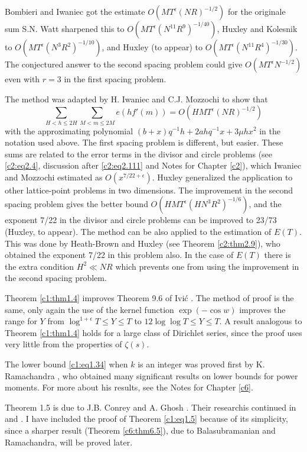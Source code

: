 Bombieri and Iwaniec got the estimate $O(MT^\epsilon (NR)^{-1/2})$ for
the originale sum S.N. Watt \cite{Watt1} sharpened this to $O (MT^\epsilon
(N^{11}R^9)^{-1/40})$,  Huxley and Kolesnik \cite{Huxley and Kolesnik1}\pageoriginale to
$O(MT^\epsilon (N^3 R^2)^{-1/10})$, and Huxley (to appear) to
$O(MT^\epsilon (N^{11} R^4)^{-1/30})$. The conjectured answer to the
second spacing problem could give $O(MT^\epsilon N^{- 1/2})$ even with
$r=3$ in the first spacing problem.

The method was adapted by H. Iwaniec and C.J. Mozzochi \cite{Iwaniec1} to
show that
$$
\sum_{H < h \leq 2H} \sum_{M< m \leq 2M} e(hf' (m))= O(HMT^\epsilon
(NR)^{-1/2}) 
$$ 
with the approximating polynomial $(b + x)q^{-1}h + 2 ah q^{-1} x+ 3
\mu h x^2$ in the notation used above. The first spacing problem is
different, but easier. These sums are related to the error terms in
the divisor and circle problems (see \eqref{c2:eq2.4}, discussion
after \eqref{c2:eq2.111} and Notes for Chapter \ref{c2}), which Iwaniec and
Mozzochi estimated as $O(x^{7/22+ \epsilon})$. Huxley \cite{Huxley2}
generalized the application to other lattice-point problems in two
dimensions. The improvement in the second spacing problem gives the
better bound $O(HMT^\epsilon (HN^3 R^2)^{-1/6})$, and the exponent 7/22
  in the divisor and circle problems can be improved to 23/73 (Huxley,
  to appear). The method can be also applied to the estimation of
  $E(T)$. This was done by Heath-Brown and Huxley \cite{Heath-Brown and Huxley1} (see
  Theorem \ref{c2:thm2.9}), who obtained the exponent 7/22 in this
  problem also.  In the case of $E(T)$ there is the extra condition
  $H^2 \ll NR$ which prevents one from using the improvement in the
  second spacing problem.

Theorem \ref{c1:thm1.4} improves Theorem 9.6 of Ivi\'c
\cite{Ivic1}. The method of proof is the same, only again the use of the
kernel function $\exp(- \cos w)$ improves the range for $Y$ from
$\log^{1+ \epsilon} T \leq Y \leq T$ to $12 \log \log T \leq Y \leq
T$. A result analogous to Theorem \ref{c1:thm1.4} holds for a large
class of Dirichlet series, since the proof uses very little from the
properties of $\zeta(s)$.

The lower bound \eqref{c1:eq1.34} when $k$ is an integer was proved
first by K. Ramachandra \cite{Ramachandra3}, who obtained many significant
results on lower bounds for power moments. For more about his results,
see the Notes for Chapter \ref{c6}.

Theorem 1.5 is due to J.B. Conrey and A. Ghosh \cite{Conrey and Ghosh1}. Their
research\pageoriginale is continued in \cite{Conrey and Ghosh3} and \cite{Conrey and Ghosh4}. I have
included the proof of Theorem \ref{c1:eq1.5} because of its
simplicity, since a sharper result (Theorem \ref{c6:thm6.5}), due to
Balasubramanian and Ramachandra, will be proved later.

